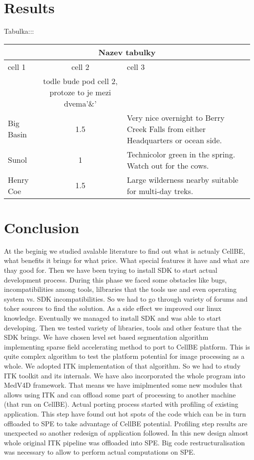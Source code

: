 \chapter{Results}
Tabulka:::
\begin{center}
\begin{tabular}{|l|c|p{3.5in}|}
\hline
\multicolumn{3}{|c|}{Nazev tabulky}\\ 
\hline cell 1&cell 2&cell 3\\&todle bude pod cell 2, protoze to je mezi dvema'\&' &\\ 
\hline Big Basin&1.5&Very nice overnight to Berry Creek Falls from
either Headquarters or ocean side.\\ 
\hline Sunol&1&Technicolor green in the spring. Watch out for the cows.\\ 
\hline Henry Coe&1.5&Large wilderness nearby suitable for multi-day treks.\\ 
\hline
\end{tabular}
\end{center}

\chapter{Conclusion}

At the beginig we studied avalable literature to find out what is actualy CellBE, what benefits it brings for what price.
What special features it have and what are thay good for.
Then we have been trying to install SDK to start actual development process.
During this phase we faced some obstacles like bugs, incompatibilities among tools, lilbraries that the tools use and even operating system vs. SDK incompatibilities.
So we had to go through variety of forums and toher sources to find the solution.
As a side effect we improved our linux knowledge.
Eventually we managed to install SDK and was able to start developing.
Then we tested variety of libraries, tools and other feature that the SDK brings.
We have chosen level set based segmentation algorithm implementing sparse field accelerating method to port to CellBE platform.
This is quite complex algorithm to test the platform potential for image processing as a whole.
We adopted ITK implementation of that algorithm.
So we had to study ITK toolkit and its internals.
We have also incorporated the whole program into MedV4D framework.
That means we have imiplmented some new modules that allows using ITK and can offload some part of processing to another machine (that run on CellBE).
Actual porting process started with profiling of existing application.
This step have found out hot spots of the code which can be in turn offloaded to SPE to take advantage of CellBE potential.
Profiling step results are unexpected so another redesign of application followed.
In this new design almost whole original ITK pipeline was offloaded into SPE.
Big code restructuralisation was necessary to allow to perform actual computations on SPE.

